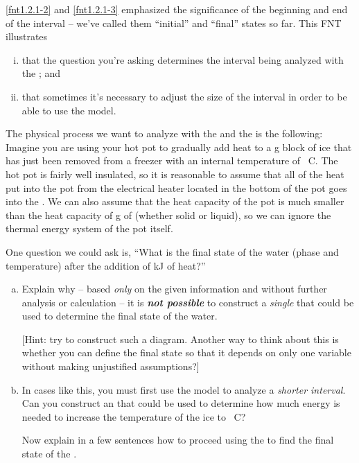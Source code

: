 \label{fnt1.2.1-4}

\ref{fnt1.2.1-2} and \ref{fnt1.2.1-3} emphasized the significance of the beginning and end of the interval -- we've called them ``initial'' and ``final'' states so far. This FNT illustrates
\begin{enumerate}[(i)]

	\item that the question you're asking determines the interval being analyzed with the \EnergyInteractionModel{}; and

	\item that sometimes it's necessary to adjust the size of the interval in order to be able to use the model.

\end{enumerate}

\noindent The physical process we want to analyze with the \ThreePhaseModel{} and the \EnergyInteractionModel{} is the following:\\

\noindent Imagine you are using your hot pot to gradually add heat to a \unit[500]{g} block of ice that has just been removed from a freezer with an internal temperature of \unit[-25]{\textdegree C}. The hot pot is fairly well insulated, so it is reasonable to assume that all of the heat put into the pot from the electrical heater located in the bottom of the pot goes into the . We can also assume that the heat capacity of the pot is much smaller than the heat capacity of \unit[500]{g} of  (whether solid or liquid), so we can ignore the thermal energy system of the pot itself.

One question we could ask is, ``What is the final state of the water (phase and temperature) after the addition of \unit[252]{kJ} of heat?'' 

\begin{enumerate}[(a)]

	\item Explain why -- based {\em only} on the given information and without further analysis or calculation -- it is \textbf{\em not possible} to construct a {\em single} \EnergyDiagram{} that could be used to determine the final state of the water.
	
		[Hint: try to construct such a diagram. Another way to think about this is whether you can define the final state so that it depends on only one variable without making unjustified assumptions?]

	\item In cases like this, you must first use the model to analyze a {\em shorter interval}. Can you construct an \EnergyDiagram{} that could be used to determine how much energy is needed to increase the temperature of the ice to \unit[0]{\textdegree C}?
	
		Now explain in a few sentences how to proceed using the \EnergyInteractionModel{} to find the final state of the .

\end{enumerate}